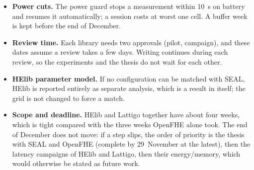 \documentclass[11pt]{article}
\begin{document}
\begin{itemize}[leftmargin=*, itemsep=2pt]
  \item \textbf{Power cuts.} The power guard stops a measurement within 10~s on battery and resumes it automatically; a session costs at worst one cell. A buffer week is kept before the end of December.
  \item \textbf{Review time.} Each library needs two approvals (pilot, campaign), and these dates assume a review takes a few days. Writing continues during each review, so the experiments and the thesis do not wait for each other.
  \item \textbf{HElib parameter model.} If no configuration can be matched with SEAL, HElib is reported entirely as separate analysis, which is a result in itself; the grid is not changed to force a match.
  \item \textbf{Scope and deadline.} HElib and Lattigo together have about four weeks, which is tight compared with the three weeks OpenFHE alone took. The end of December does not move: if a step slips, the order of priority is the thesis with SEAL and OpenFHE (complete by 29~November at the latest), then the latency campaigns of HElib and Lattigo, then their energy/memory, which would otherwise be stated as future work.
\end{itemize}
\end{document}
